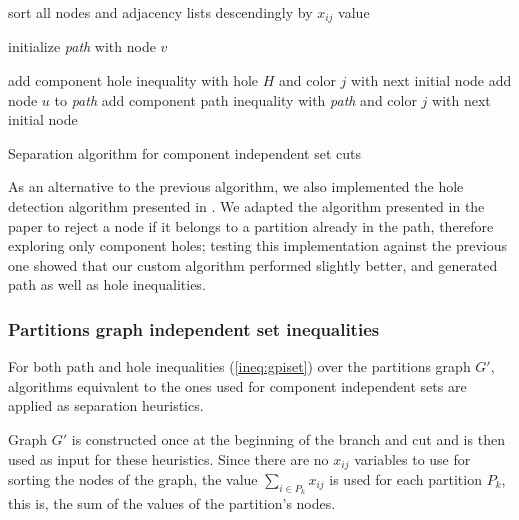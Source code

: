 \begin{algorithm}
\label{alg:sep:ciset}

\begin{algorithmic}

\STATE sort all nodes and adjacency lists descendingly by $x_{ij}$ value
 
	\STATE initialize \textit{path} with node $v$

	\LOOP
					\STATE add component hole inequality with hole $H$ and color $j$
					\CONTINUE with next initial node
				\ENDIF
			\ELSE
				\STATE add node $u$ to \textit{path}	
					\STATE add component path inequality with \textit{path} and color $j$
					\CONTINUE with next initial node
				\ENDIF
			\ENDIF
		\ENDFOR
	\ENDLOOP
\ENDFOR

\ENDFOR

\caption{Separation algorithm for component independent set cuts}

\end{algorithmic}
\end{algorithm}

As an alternative to the previous algorithm, we also implemented the hole detection algorithm presented in \cite{nikolopoulos2004hole}. We adapted the algorithm presented in the paper to reject a node if it belongs to a partition already in the path, therefore exploring only component holes; testing this implementation against the previous one showed that our custom algorithm performed slightly better, and generated path as well as hole inequalities.

\subsubsection{Partitions graph independent set inequalities}

For both path and hole inequalities (\ref{ineq:gpiset}) over the partitions graph $G'$, algorithms equivalent to the ones used for component independent sets are applied as separation heuristics.

Graph $G'$ is constructed once at the beginning of the branch and cut and is then used as input for these heuristics. Since there are no $x_{ij}$ variables to use for sorting the nodes of the graph, the value $\sum_{i \in P_k} x_{ij}$ is used for each partition $P_k$, this is, the sum of the values of the partition's nodes.

